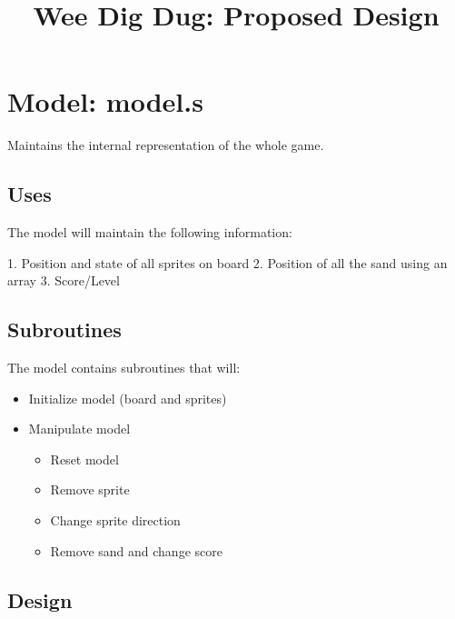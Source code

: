 

\title{Wee Dig Dug: Proposed Design}


  
  \tableofcontents\newpage

\section{Model: model.s}

Maintains the internal representation of the whole game.

\subsection{Uses}

The model will maintain the following information:

1. Position and state of all sprites on board
2. Position of all the sand using an array
3. Score/Level

\subsection{Subroutines}

The model contains subroutines that will:

\begin{itemize}
  \item Initialize model (board and sprites)
  \item Manipulate model
  \begin{itemize}
    \item Reset model
    \item Remove sprite
    \item Change sprite direction
    \item Remove sand and change score
  \end{itemize}
\end{itemize}

\subsection{Design}

